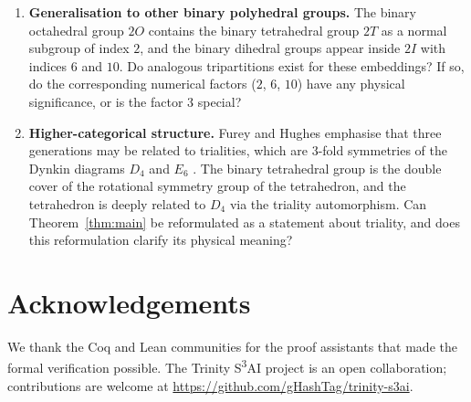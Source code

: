 \documentclass[10pt,reqno]{amsart}
\theoremstyle{plain}
\theoremstyle{definition}
\begin{document}
\begin{enumerate}
\item \textbf{Generalisation to other binary polyhedral groups.} The binary octahedral group $2O$ contains the binary tetrahedral group $2T$ as a normal subgroup of index $2$, and the binary dihedral groups appear inside $2I$ with indices $6$ and $10$. Do analogous tripartitions exist for these embeddings? If so, do the corresponding numerical factors ($2$, $6$, $10$) have any physical significance, or is the factor $3$ special?

\item \textbf{Higher-categorical structure.} Furey and Hughes emphasise that three generations may be related to trialities, which are $3$-fold symmetries of the Dynkin diagrams $D_4$ and $E_6$ \cite{FureyHughes2024}. The binary tetrahedral group is the double cover of the rotational symmetry group of the tetrahedron, and the tetrahedron is deeply related to $D_4$ via the triality automorphism. Can Theorem~\ref{thm:main} be reformulated as a statement about triality, and does this reformulation clarify its physical meaning?
\end{enumerate}

\section*{Acknowledgements}

We thank the Coq and Lean communities for the proof assistants that made the formal verification possible. The Trinity S\textsuperscript{3}AI project is an open collaboration; contributions are welcome at \url{https://github.com/gHashTag/trinity-s3ai}.



\end{document}
